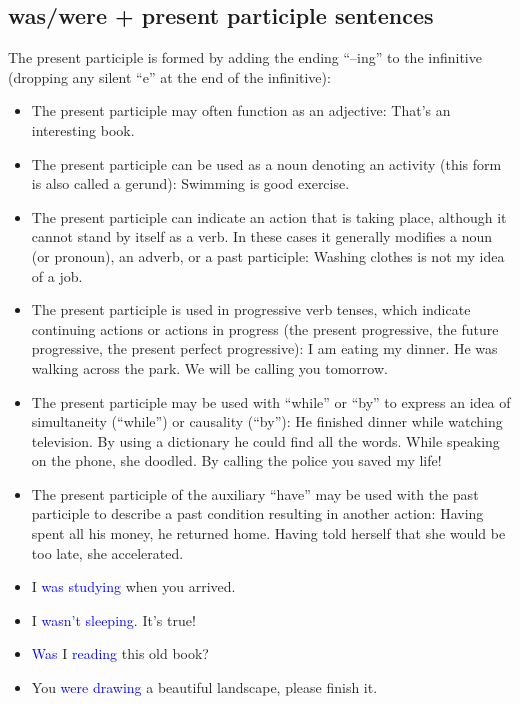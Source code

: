 \subsection{was/were + present participle sentences}
\begin{multicols}{2}

The present participle is formed by adding the ending ``–ing'' to the infinitive (dropping any silent ``e'' at the end of the infinitive):

\begin{itemize}
\item The present participle may often function as an adjective: That's an interesting book.
\item The present participle can be used as a noun denoting an activity (this form is also called a gerund): Swimming is good exercise.
\item The present participle can indicate an action that is taking place, although it cannot stand by itself as a verb. In these cases it generally modifies a noun (or pronoun), an adverb, or a past participle: Washing clothes is not my idea of a job.
\item The present participle is used in progressive verb tenses, which indicate continuing actions or actions in progress (the present progressive, the future progressive, the present perfect progressive): I am eating my dinner. He was walking across the park. We will be calling you tomorrow.
\item The present participle may be used with ``while'' or ``by'' to express an idea of simultaneity (``while'') or causality (``by''): He finished dinner while watching television. By using a dictionary he could find all the words. While speaking on the phone, she doodled. By calling the police you saved my life!
\item The present participle of the auxiliary ``have'' may be used with the past participle to describe a past condition resulting in another action: Having spent all his money, he returned home. Having told herself that she would be too late, she accelerated.
\end{itemize}
\begin{itemize}
\item I \textcolor{blue}{was studying} when you arrived.
\item I \textcolor{blue}{wasn't sleeping}. It's true!
\item \textcolor{blue}{Was} I \textcolor{blue}{reading} this old book?
\item You \textcolor{blue}{were drawing} a beautiful landscape, please finish it.

\end{itemize}
\end{multicols}
